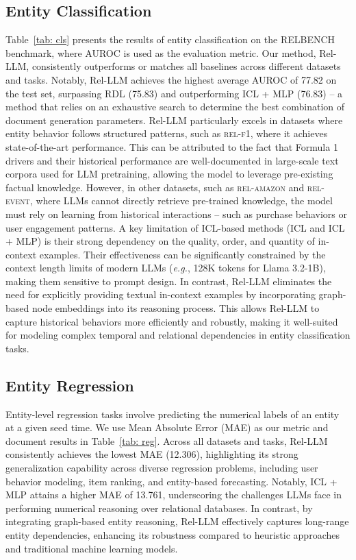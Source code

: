 \documentclass[11pt]{article}
\begin{document}
\subsection{Entity Classification}
Table~\ref{tab: cls} presents the results of entity classification on the RELBENCH benchmark, where AUROC is used as the evaluation metric. Our method, Rel-LLM, consistently outperforms or matches all baselines across different datasets and tasks. Notably, Rel-LLM achieves the highest average AUROC of 77.82 on the test set, surpassing RDL (75.83) and outperforming ICL + MLP (76.83) -- a method that relies on an exhaustive search to determine the best combination of document generation parameters.
Rel-LLM particularly excels in datasets where entity behavior follows structured patterns, such as \textsc{rel-f1}, where it achieves state-of-the-art performance. This can be attributed to the fact that Formula 1 drivers and their historical performance are well-documented in large-scale text corpora used for LLM pretraining, allowing the model to leverage pre-existing factual knowledge. However, in other datasets, such as \textsc{rel-amazon} and \textsc{rel-event}, where LLMs cannot directly retrieve pre-trained knowledge, the model must rely on learning from historical interactions -- such as purchase behaviors or user engagement patterns.
A key limitation of ICL-based methods (ICL and ICL + MLP) is their strong dependency on the quality, order, and quantity of in-context examples. Their effectiveness can be significantly constrained by the context length limits of modern LLMs (\emph{e.g.}, 128K tokens for Llama 3.2-1B), making them sensitive to prompt design. In contrast, Rel-LLM eliminates the need for explicitly providing textual in-context examples by incorporating graph-based node embeddings into its reasoning process. This allows Rel-LLM to capture historical behaviors more efficiently and robustly, making it well-suited for modeling complex temporal and relational dependencies in entity classification tasks.

\subsection{Entity Regression}
Entity-level regression tasks involve predicting the numerical labels of an entity at a given seed time. We use Mean Absolute Error (MAE) as our metric and document results in Table~\ref{tab: reg}. Across all datasets and tasks, Rel-LLM consistently achieves the lowest MAE (12.306), highlighting its strong generalization capability across diverse regression problems, including user behavior modeling, item ranking, and entity-based forecasting. Notably, ICL + MLP attains a higher MAE of 13.761, underscoring the challenges LLMs face in performing numerical reasoning over relational databases. In contrast, by integrating graph-based entity reasoning, Rel-LLM effectively captures long-range entity dependencies, enhancing its robustness compared to heuristic approaches and traditional machine learning models. 
\end{document}
